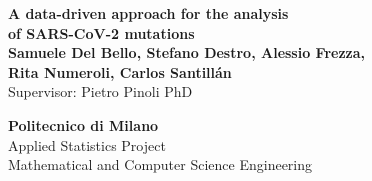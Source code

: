 \documentclass[a0,landscape]{a0poster}
\begin{document}
	
	
	
	\begin{minipage}[b]{0.55\linewidth}
		\veryHuge \color{NavyBlue} \textbf{A data-driven approach for the analysis \\of SARS-CoV-2 mutations}\\[1cm] 
		\huge \textbf{Samuele Del Bello, Stefano Destro, Alessio Frezza, \\Rita Numeroli, Carlos Santillán}\\ 
		\huge Supervisor: Pietro Pinoli PhD\ 
	\end{minipage}
	\begin{minipage}[b]{0.25\linewidth}
		\color{DarkSlateGray}\Large \textbf{Politecnico di Milano}\\
		Applied Statistics Project\\ %
		Mathematical and Computer Science Engineering\\
	\end{minipage}
	
	\vspace{1cm} %
	
	
\end{document}
